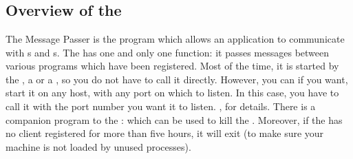 
\part{\MPA{}}



\chapter*{Overview of the \MPA{}}


The Message Passer is the program which allows an application to communicate
with \CPK{}s and \XPK{}s. The \MPA{} has one and only one function: it passes
messages between various programs which have been registered. Most of the time,
it is started by the \OPRSS{}, a \XPK{} or a \CPK{}, so you do not have to call
it directly.  However, you can if you want, start it on any host, with any port
on which to listen. In this case, you have to call it with the port number you
want it to listen. , for details. There is
a companion program to the \MPA{}:  which can be used to kill the
\MPA{}. Moreover, if the \MPA{} has no client registered for more than five
hours, it will exit (to make sure your machine is not loaded by unused
\MPA{} processes). 

